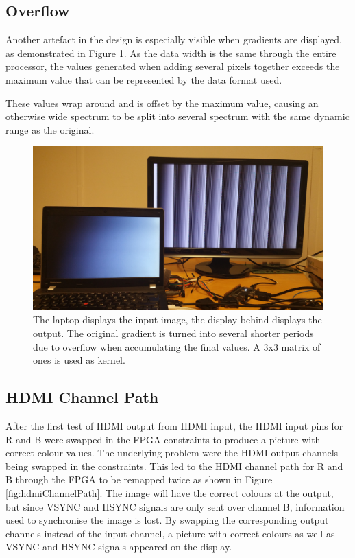 \subsection{Overflow}
Another artefact in the design is especially visible when gradients are displayed, as demonstrated in Figure \ref{fig:Overflow}.
As the data width is the same through the entire processor, the values generated when adding several pixels together exceeds the maximum value that can be represented by the data format used.

These values wrap around and is offset by the maximum value, causing an otherwise wide spectrum to be split into several spectrum with the same dynamic range as the original.

\begin{figure}
    \centering
    \includegraphics[width=14cm]{img/gradient_test}
    \caption[Gradient Output]{
        The laptop displays the input image, the display behind displays the output.
        The original gradient is turned into several shorter periods due to overflow when accumulating the final values.
        A 3x3 matrix of ones is used as kernel.
    }
    \label{fig:Overflow}

\end{figure}

\subsection{HDMI Channel Path}
After the first test of HDMI output from HDMI input, the HDMI input pins for R and B were swapped in the FPGA constraints to produce a picture with correct colour values.
The underlying problem were the HDMI output channels being swapped in the constraints. 
This led to the HDMI channel path for R and B through the FPGA to be remapped twice as shown in Figure \ref{fig:hdmiChannelPath}.
The image will have the correct colours at the output, but since VSYNC and HSYNC signals are only sent over channel B, information used to synchronise the image is lost.
By swapping the corresponding output channels instead of the input channel, a picture with correct colours as well as VSYNC and HSYNC signals appeared on the display.

